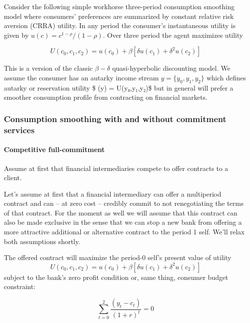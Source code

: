\documentclass[11pt]{article}
\begin{document}
    Consider the following simple workhorse three-period consumption
smoothing model where consumers' preferences are summarized by constant
relative risk aversion (CRRA) utility. In any period the consumer's
instantaneous utility is given by \(u(c)=c^{1-ρ}/(1-ρ)\). Over three
period the agent maximizes utility

\[ U(c_0, c_1, c_2) =u(c_0) + \beta [\delta u(c_1) + \delta^2 u(c_2)]\]

This is a version of the classic \(\beta-\delta\) quasi-hyperbolic
discounting model. We assume the consumer has an autarky income stream
\({y}=\{y_{0},y_{1},y_{2}\}\) which defines autarky or reservation
utility \$ (y) = U(y₀,y₁,y₂)\$ but in general will prefer a
smoother consumption profile from contracting on financial markets.

    \hypertarget{consumption-smoothing-with-and-without-commitment-services}{%
\subsubsection{Consumption smoothing with and without commitment
services}\label{consumption-smoothing-with-and-without-commitment-services}}

    \hypertarget{competitive-full-commitment}{%
\paragraph{Competitive
full-commitment}\label{competitive-full-commitment}}

Assume at first that financial intermediaries compete to offer contracts
to a client.

Let's assume at first that a financial intermediary can offer a
multiperiod contract and can -- at zero cost -- credibly commit to not
renegotiating the terms of that contract. For the moment as well we will
assume that this contract can also be made exclusive in the sense that
we can stop a new bank from offering a more attractive additional or
alternative contract to the period 1 self. We'll relax both assumptions
shortly.

    The offered contract will maximize the period-0 self's present value of
utility
\[ U(c_{0},c_{1},c_{2})=u(c_{0})+\beta \left[ \delta u(c_{1})+\delta ^{2}u(c_{2})\right] \]
subject to the bank's zero profit condition or, same thing, consumer
budget constraint:

\[\sum\limits_{t=0}^{2}\frac{\left( y_{t}-c_{t}\right) }{\left( 1+r\right) ^{t}} = 0\]
\end{document}
